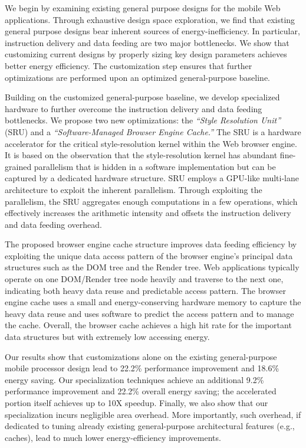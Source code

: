 We begin by examining existing general purpose designs for the mobile Web applications. Through exhaustive design space exploration, we find that existing general purpose designs bear inherent sources of energy-inefficiency. In particular, instruction delivery and data feeding are two major bottlenecks. We show that customizing current designs by properly sizing key design parameters achieves better energy efficiency. The customization step ensures that further optimizations are performed upon an optimized general-purpose baseline.

Building on the customized general-purpose baseline, we develop specialized hardware to further overcome the instruction delivery and data feeding bottlenecks. We propose two new optimizations: the \emph{``Style Resolution Unit''} (SRU) and a \emph{``Software-Managed Browser Engine Cache.''} The SRU is a hardware accelerator for the critical style-resolution kernel within the Web browser engine. It is based on the observation that the style-resolution kernel has abundant fine-grained parallelism that is hidden in a software implementation but can be captured by a dedicated hardware structure. SRU employs a GPU-like multi-lane architecture to exploit the inherent parallelism. Through exploiting the parallelism, the SRU aggregates enough computations in a few operations, which effectively increases the arithmetic intensity and offsets the instruction delivery and data feeding overhead.

The proposed browser engine cache structure improves data feeding efficiency by exploiting the unique data access pattern of the browser engine's principal data structures such as the DOM tree and the Render tree. Web applications typically operate on one DOM/Render tree node heavily and traverse to the next one, indicating both heavy data reuse and predictable access pattern. The browser engine cache uses a small and energy-conserving hardware memory to capture the heavy data reuse and uses software to predict the access pattern and to manage the cache. Overall, the browser cache achieves a high hit rate for the important data structures but with extremely low accessing energy.

Our results show that customizations alone on the existing general-purpose mobile processor design lead to 22.2\% performance improvement and 18.6\% energy saving. Our specialization techniques achieve an additional 9.2\% performance improvement and 22.2\% overall energy saving; the accelerated portion itself achieves up to 10X speedup. Finally, we also show that our specialization incurs negligible area overhead. More importantly, such overhead, if dedicated to tuning already existing general-purpose architectural features (e.g., caches), lead to much lower energy-efficiency improvements.

